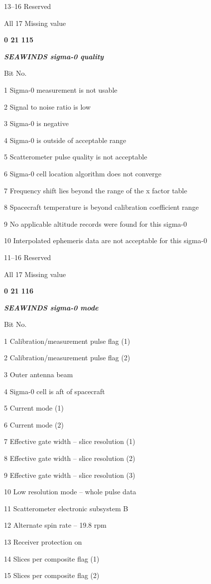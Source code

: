13--16 Reserved

All 17 Missing value

\textbf{0 21 115}

\emph{\textbf{SEAWINDS sigma-0 quality}}

Bit No.

1 Sigma-0 measurement is not usable

2 Signal to noise ratio is low

3 Sigma-0 is negative

4 Sigma-0 is outside of acceptable range

5 Scatterometer pulse quality is not acceptable

6 Sigma-0 cell location algorithm does not converge

7 Frequency shift lies beyond the range of the x factor table

8 Spacecraft temperature is beyond calibration coefficient range

9 No applicable altitude records were found for this sigma-0

10 Interpolated ephemeris data are not acceptable for this sigma-0

11--16 Reserved

All 17 Missing value

\textbf{0 21 116}

\emph{\textbf{SEAWINDS sigma-0 mode}}

Bit No.

1 Calibration/measurement pulse flag (1)

2 Calibration/measurement pulse flag (2)

3 Outer antenna beam

4 Sigma-0 cell is aft of spacecraft

5 Current mode (1)

6 Current mode (2)

7 Effective gate width -- slice resolution (1)

8 Effective gate width -- slice resolution (2)

9 Effective gate width -- slice resolution (3)

10 Low resolution mode -- whole pulse data

11 Scatterometer electronic subsystem B

12 Alternate spin rate -- 19.8 rpm

13 Receiver protection on

14 Slices per composite flag (1)

15 Slices per composite flag (2)


